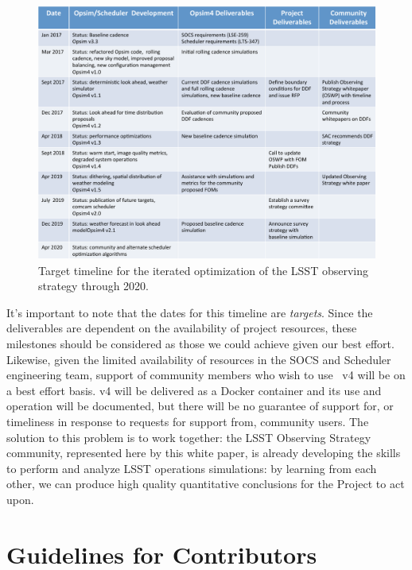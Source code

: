 \begin{figure}[t!]
\includegraphics[angle=0,width=0.9\linewidth,clip]{figs/opsim_timeline.pdf}
\caption{Target timeline for the iterated optimization of the LSST observing strategy through 2020.}
\label{fig:timeline}
\end{figure}

It's important to note that the dates for this timeline are {\it
targets}. Since the deliverables are dependent on the availability of
project resources, these milestones should be considered as those we
could achieve given our best effort. Likewise, given the limited
availability of resources in the SOCS and Scheduler engineering team,
support of community members who wish to use \OpSim~v4 will be on a best
effort basis. \OpSim v4 will be delivered as a Docker container and its
use and operation will be documented, but there will be no guarantee of
support for, or timeliness in response to requests for support from,
community users. The solution to this problem is to work together: the LSST Observing Strategy community, represented here by this white paper, is already developing the skills to perform and analyze LSST operations simulations: by learning from each other, we can produce high quality quantitative conclusions for the Project to act upon.



\navigationbar



\section{Guidelines for Contributors}
\def\secname{guidelines}\label{sec:\secname}

